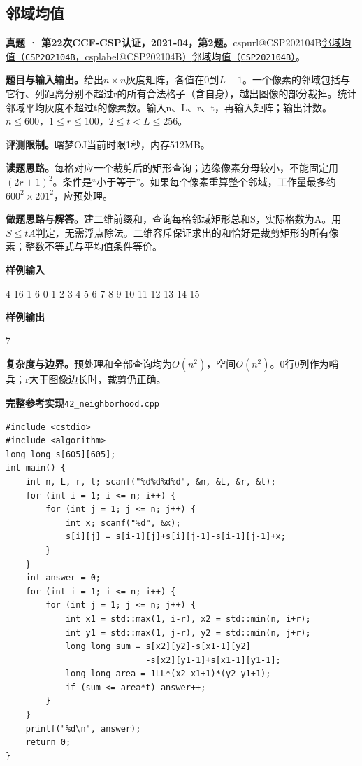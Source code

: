 \documentclass[UTF8,11pt,a4paper,fontset=none]{ctexart}
\makeatletter
\newcommand{\csp}[2]{\ifcsname cspurl@#1\endcsname\href{\csname cspurl@#1\endcsname}{#2（\texttt{#1}，\csname csplabel@#1\endcsname）}\else\href{https://oj.shumeng.tech/p/#1}{#2（\texttt{#1}）}\fi}
\makeatother
\begin{document}
\subsection{邻域均值}
\textbf{真题 · 第22次CCF-CSP认证，2021-04，第2题。}\csp{CSP202104B}{邻域均值}。

\noindent\textbf{题目与输入输出。}给出$n\times n$灰度矩阵，各值在0到$L-1$。一个像素的邻域包括与它行、列距离分别不超过r的所有合法格子（含自身），越出图像的部分裁掉。统计邻域平均灰度不超过t的像素数。输入n、L、r、t，再输入矩阵；输出计数。$n\le600$，$1\le r\le100$，$2\le t<L\le256$。

\noindent\textbf{评测限制。}曙梦OJ当前时限1秒，内存512MB。

\noindent\textbf{读题思路。}每格对应一个裁剪后的矩形查询；边缘像素分母较小，不能固定用$(2r+1)^2$。条件是“小于等于”。如果每个像素重算整个邻域，工作量最多约$600^2\times201^2$，应预处理。

\noindent\textbf{做题思路与解答。}建二维前缀和，查询每格邻域矩形总和S，实际格数为A。用$S\le tA$判定，无需浮点除法。二维容斥保证求出的和恰好是裁剪矩形的所有像素；整数不等式与平均值条件等价。
\begin{tcolorbox}[samplebox,title={输入输出样例}]
\textbf{样例输入}
\begin{Sample}
4 16 1 6
0 1 2 3
4 5 6 7
8 9 10 11
12 13 14 15
\end{Sample}
\tcblower
\textbf{样例输出}
\begin{Sample}
7
\end{Sample}
\end{tcolorbox}

\noindent\textbf{复杂度与边界。}预处理和全部查询均为$O(n^2)$，空间$O(n^2)$。0行0列作为哨兵；r大于图像边长时，裁剪仍正确。
\par\noindent\begin{minipage}{\linewidth}
\textbf{完整参考实现}\quad\texttt{42\_neighborhood.cpp}
\begin{lstlisting}
#include <cstdio>
#include <algorithm>
long long s[605][605];
int main() {
    int n, L, r, t; scanf("%d%d%d%d", &n, &L, &r, &t);
    for (int i = 1; i <= n; i++) {
        for (int j = 1; j <= n; j++) {
            int x; scanf("%d", &x);
            s[i][j] = s[i-1][j]+s[i][j-1]-s[i-1][j-1]+x;
        }
    }
    int answer = 0;
    for (int i = 1; i <= n; i++) {
        for (int j = 1; j <= n; j++) {
            int x1 = std::max(1, i-r), x2 = std::min(n, i+r);
            int y1 = std::max(1, j-r), y2 = std::min(n, j+r);
            long long sum = s[x2][y2]-s[x1-1][y2]
                            -s[x2][y1-1]+s[x1-1][y1-1];
            long long area = 1LL*(x2-x1+1)*(y2-y1+1);
            if (sum <= area*t) answer++;
        }
    }
    printf("%d\n", answer);
    return 0;
}
\end{lstlisting}
\end{minipage}\par
\end{document}
